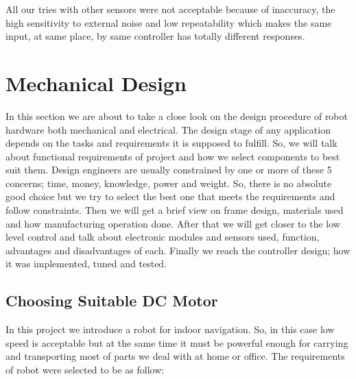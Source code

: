\documentclass[12pt]{article}
\begin{document}
	\noindent All our tries with other sensors were not acceptable because of inaccuracy, the high sensitivity to external noise and low repeatability which makes the same input, at same place, by same controller has totally different responses. 
\newpage


\section{Mechanical Design}
In this section we are about to take a close look on the design procedure of robot hardware both mechanical and electrical. The design stage of any application depends on the tasks and requirements it is supposed to fulfill. So, we will talk about functional requirements of project and how we select components to best suit them. Design engineers are usually constrained by one or more of these 5 concerns; time, money, knowledge, power and weight. So, there is no absolute good choice but we try to select the best one that meets the requirements and follow constraints. \cite{203} Then we will get a brief view on frame design, materials used and how manufacturing operation done. After that we will get closer to the low level control and talk about electronic modules and sensors used, function, advantages and disadvantages of each. Finally we reach the controller design; how it was implemented, tuned and tested.  

\subsection{Choosing Suitable DC Motor  \cite{203}}
In this project we introduce a robot for indoor navigation. So, in this case low speed is acceptable but at the same time it must be powerful enough for carrying and transporting most of parts we deal with at home or office. The requirements of robot were selected to be as follow:
\end{document}
